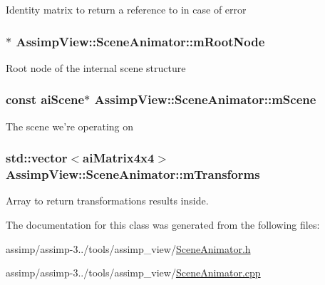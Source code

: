 Identity matrix to return a reference to in case of error \hypertarget{class_assimp_view_1_1_scene_animator_a37b1c60f39ab41656731cd90b0597f13}{
\subsubsection[{m\+Root\+Node}]{$\ast$ Assimp\+View\+::\+Scene\+Animator\+::m\+Root\+Node\hspace{0.3cm}{\ttfamily [protected]}}}\label{class_assimp_view_1_1_scene_animator_a37b1c60f39ab41656731cd90b0597f13}
Root node of the internal scene structure \hypertarget{class_assimp_view_1_1_scene_animator_a4fe1542596fc5b5287fc2ad54d486379}{
\subsubsection[{m\+Scene}]{\setlength{\rightskip}{0pt plus 5cm}const {\bf ai\+Scene}$\ast$ Assimp\+View\+::\+Scene\+Animator\+::m\+Scene\hspace{0.3cm}{\ttfamily [protected]}}}\label{class_assimp_view_1_1_scene_animator_a4fe1542596fc5b5287fc2ad54d486379}
The scene we're operating on \hypertarget{class_assimp_view_1_1_scene_animator_a78e94ddc3e4866d76d336bc769aceca8}{
\subsubsection[{m\+Transforms}]{\setlength{\rightskip}{0pt plus 5cm}std\+::vector$<${\bf ai\+Matrix4x4}$>$ Assimp\+View\+::\+Scene\+Animator\+::m\+Transforms\hspace{0.3cm}{\ttfamily [protected]}}}\label{class_assimp_view_1_1_scene_animator_a78e94ddc3e4866d76d336bc769aceca8}
Array to return transformations results inside. 

The documentation for this class was generated from the following files\+:\begin{DoxyCompactItemize}
\item 
assimp/assimp-\/3../tools/assimp\+\_\+view/\hyperlink{_scene_animator_8h}{Scene\+Animator.\+h}\item 
assimp/assimp-\/3../tools/assimp\+\_\+view/\hyperlink{_scene_animator_8cpp}{Scene\+Animator.\+cpp}\end{DoxyCompactItemize}
